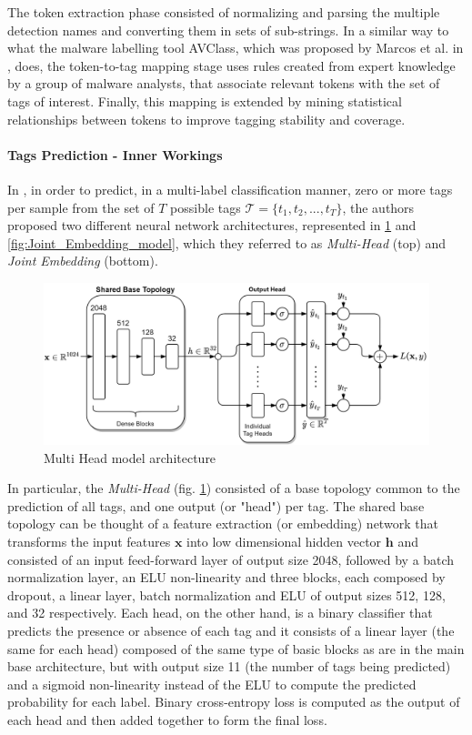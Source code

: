 \documentclass[pdfa%
,cucitura%
]{toptesi}
\begin{document}
The token extraction phase consisted of normalizing and parsing the multiple detection names and converting them in sets of sub-strings. In a similar way to what the malware labelling tool AVClass, which was proposed by Marcos et al. in \cite{MarcosAVclass}, does, the token-to-tag mapping stage uses rules created from expert knowledge by a group of malware analysts, that associate relevant tokens with the set of tags of interest. Finally, this mapping is extended by mining statistical relationships between tokens to improve tagging stability and coverage.

\paragraph{Tags Prediction - Inner Workings}\label{par:tagPredictionImplementation}
In \cite{DucauAMDATSE}, in order to predict, in a multi-label classification manner, zero or more tags per sample from the set of $T$ possible tags $\mathcal{T} = \{t_1, t_2, ..., t_T\}$, the authors proposed two different neural network architectures, represented in \ref{fig:Multi_Head_model} and \ref{fig:Joint_Embedding_model}, which they referred to as \textit{Multi-Head} (top) and \textit{Joint Embedding} (bottom).

\begin{figure}[h]
	\centering
	\includegraphics[width=\textwidth]{./images/Multi_Head.png}
	\caption[Multi Head model architecture]{Multi Head model architecture}
	\label{fig:Multi_Head_model}
\end{figure}

In particular, the \textit{Multi-Head} (fig. \ref{fig:Multi_Head_model}) consisted of a base topology common to the prediction of all tags, and one output (or "head") per tag. The shared base topology can be thought of a feature extraction (or embedding) network that transforms the input features $\textbf{x}$ into low dimensional hidden vector $\textbf{h}$ and consisted of an input feed-forward layer of output size 2048, followed by a batch normalization layer, an ELU non-linearity and three blocks, each composed by dropout, a linear layer, batch normalization and ELU of output sizes 512, 128, and 32 respectively. Each head, on the other hand, is a binary classifier that predicts the presence or absence of each tag and it consists of a linear layer (the same for each head) composed of the same type of basic blocks as are in the main base architecture, but with output size 11 (the number of tags being predicted) and a sigmoid non-linearity instead of the ELU to compute the predicted probability for each label. Binary cross-entropy loss is computed as the output of each head and then added together to form the final loss.
\end{document}
